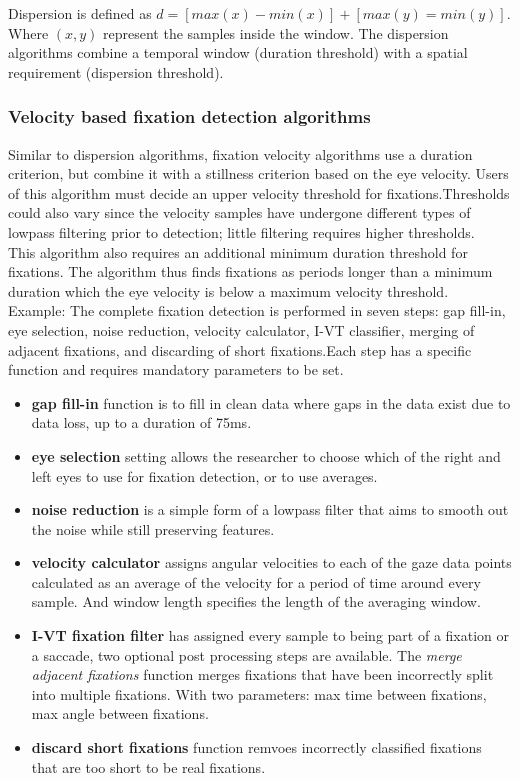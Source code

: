 \documentclass[12pt]{article}
\theoremstyle{definition}
\begin{document}
Dispersion is defined as $d = [max(x) - min(x)] + [max(y) = min(y)]$. Where $(x,y)$ represent the samples inside the window. The dispersion algorithms combine a temporal window (duration threshold) with a spatial requirement (dispersion threshold).

\subsubsection{Velocity based fixation detection algorithms}
Similar to dispersion algorithms, fixation velocity algorithms use a duration criterion, but combine it with a stillness criterion based on the eye velocity. Users of this algorithm must decide an upper velocity threshold for fixations.Thresholds could also vary since the velocity samples have undergone different types of lowpass filtering prior to detection; little filtering requires higher thresholds. \\

This algorithm also requires an additional minimum duration threshold for fixations. The algorithm thus finds fixations as periods longer than a minimum duration which the eye velocity is below a maximum velocity threshold.\\

Example: The complete fixation detection is performed in seven steps: gap fill-in, eye selection, noise reduction, velocity calculator, I-VT classifier, merging of adjacent fixations, and discarding of short fixations.Each step has a specific function and requires mandatory parameters to be set. 
\begin{itemize}
\item \textbf{gap fill-in} function is to fill in clean data where gaps in the data exist due to data loss, up to a duration of 75ms. 

\item \textbf{eye selection} setting allows the researcher to choose which of the right and left eyes to use for fixation detection, or to use averages. 

\item \textbf{noise reduction} is a simple form of a lowpass filter that aims to smooth out the noise while still preserving features.

\item \textbf{velocity calculator} assigns angular velocities to each of the gaze data points calculated as an average of the velocity for a period of time around every sample. And window length specifies the length of the averaging window.

\item \textbf{I-VT fixation filter} has assigned every sample to being part of a fixation or a saccade, two optional post processing steps are available. The \textit{merge adjacent fixations} function merges fixations that have been incorrectly split into multiple fixations. With two parameters: max time between fixations, max angle between fixations. 

\item \textbf{discard short fixations} function remvoes incorrectly classified fixations that are too short to be real fixations. 
\end{itemize}
\end{document}
